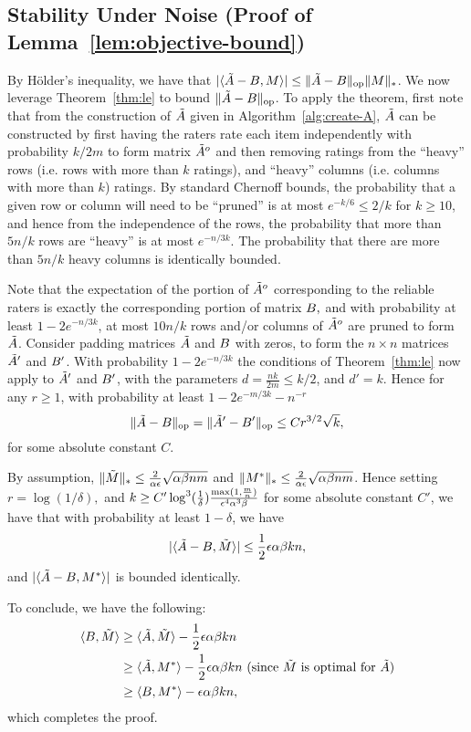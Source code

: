 \subsection{Stability Under Noise (Proof of Lemma~\ref{lem:objective-bound})}
\label{sec:objective-bound-proof}

By H\"{o}lder's inequality, we have that $|\langle \tilde{A}-B, M \rangle| \leq \|\tilde{A}-B\|_{\mathrm{op}}\|M\|_*$.   We now leverage Theorem~\ref{thm:le} to bound $\|\tilde{A}-B\|_{\mathrm{op}}$.  To apply the theorem, first note that from the construction of $\tilde{A}$ given in Algorithm~\ref{alg:create-A}, $\tilde{A}$ can be constructed by first having the raters rate each item independently with probability $k/2m$ to form matrix $\tilde{A}^o$ and then removing ratings from the ``heavy'' rows (i.e. rows with more than $k$ ratings), and ``heavy'' columns (i.e. columns with more than $k$) ratings.  By standard Chernoff bounds, the probability that a given row or column will need to be ``pruned'' is at most $e^{-k/6} \le 2/k$ for $k\ge 10$, and hence from the independence of the rows, the probability that more than $5n/k$ rows are ``heavy'' is at most $e^{-n/3k}$.  The probability that there are more than $5n/k$ heavy columns is identically bounded.

 Note that the expectation of the portion of $\tilde{A}^o$ corresponding to the reliable raters is exactly the corresponding portion of matrix $B,$ and with probability at least $1-2e^{-n/3k}$, at most $10 n/k$ rows and/or columns of $\tilde{A}^o$ are pruned to form $\tilde{A}$.  Consider padding matrices $\tilde{A}$ and $B$ with zeros, to form the $n \times n$ matrices $\tilde{A}'$ and $B'$.   With probability $1-2e^{-n/3k}$ the conditions of Theorem~\ref{thm:le} now apply to $\tilde{A}'$ and $B'$, with the parameters $d = \frac{n k}{2m} \le k/2$, and $d' =  k$.  Hence for any $r \ge 1$, with probability at least $1-2e^{-m/3k} -n^{-r}$ $$\|\tilde{A}-B\|_{\mathrm{op}} = \|\tilde{A}'-B'\|_{\mathrm{op}} \le C r^{3/2} \sqrt{k},$$ for some absolute constant $C$.  

By assumption, $\|\tilde{M}\|_* \le \frac{2}{\alpha \epsilon}\sqrt{\alpha \beta n m}$ and $\|M^*\|_* \le \frac{2}{\alpha \epsilon}\sqrt{\alpha \beta n m}$.   Hence setting $r= \log (1/\delta),$ and $k \ge C' \log^3(\frac{1}{\delta}) \frac{\max (1,\frac{m}{n})}{\epsilon^4 \alpha^3 \beta}$ for some absolute constant $C'$, we have that with probability at least $1-\delta$, we have $$|\langle \tilde{A}-B, \tilde{M} \rangle|  \le \frac{1}{2} \epsilon \alpha \beta k n,$$ and $|\langle \tilde{A}-B, M^* \rangle|$ is bounded identically.

To conclude, we have the following:
\begin{align}
\langle B, \tilde{M} \rangle  &\geq \langle \tilde{A}, \tilde{M} \rangle - \frac{1}{2}\epsilon \alpha \beta k n \\
 &\geq \langle \tilde{A}, M^* \rangle - \frac{1}{2} \epsilon \alpha \beta k n \text{ (since $\tilde{M}$ is optimal for $\tilde{A}$)} \\
 &\geq \langle B, M^* \rangle - \epsilon \alpha \beta k n,
\end{align}
which completes the proof.



